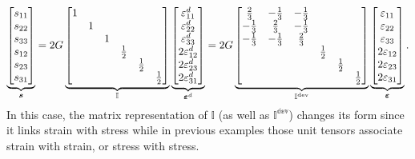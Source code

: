 \begin{gather}\label{eq:dev_tensor_se}
\underbrace{\begin{bmatrix}
s_{11}\\
s_{22}\\
s_{33}\\
s_{12}\\
s_{23}\\
s_{31}
\end{bmatrix}}_{\bm{s}}
=
2G\underbrace{\begin{bmatrix}
1&&&&&\\
&1&&&&\\
&&1&&&\\
&&&\frac{1}{2}&&\\
&&&&\frac{1}{2}&\\
&&&&&\frac{1}{2}
\end{bmatrix}}_{\mathbb{I}}
\underbrace{\begin{bmatrix}
\varepsilon^d_{11}\\
\varepsilon^d_{22}\\
\varepsilon^d_{33}\\
2\varepsilon^d_{12}\\
2\varepsilon^d_{23}\\
2\varepsilon^d_{31}
\end{bmatrix}}_{\bm{\varepsilon}^d}
=
2G\underbrace{\begin{bmatrix}
\frac{2}{3}&-\frac{1}{3}&-\frac{1}{3}&&&\\
-\frac{1}{3}&\frac{2}{3}&-\frac{1}{3}&&&\\
-\frac{1}{3}&-\frac{1}{3}&\frac{2}{3}&&&\\
&&&\frac{1}{2}&&\\
&&&&\frac{1}{2}&\\
&&&&&\frac{1}{2}
\end{bmatrix}}_{\mathbb{I^\text{dev}}}
\underbrace{\begin{bmatrix}
\varepsilon_{11}\\
\varepsilon_{22}\\
\varepsilon_{33}\\
2\varepsilon_{12}\\
2\varepsilon_{23}\\
2\varepsilon_{31}
\end{bmatrix}}_{\bm{\varepsilon}}.
\end{gather}
In this case, the matrix representation of $\mathbb{I}$ (as well as $\mathbb{I^\text{dev}}$) changes its form since it links strain with stress while in previous examples those unit tensors associate strain with strain, or stress with stress.

